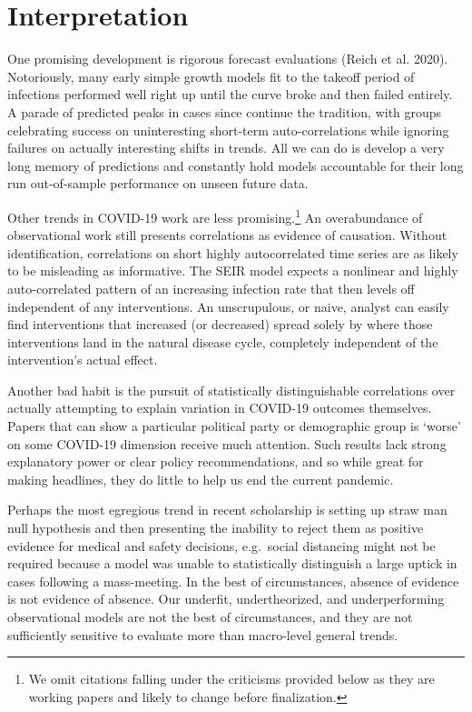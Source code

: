 \documentclass[
]{article}
\begin{document}
\hypertarget{interpretation}{%
\section{Interpretation}\label{interpretation}}

One promising development is rigorous forecast evaluations (Reich et al.
2020). Notoriously, many early simple growth models fit to the takeoff
period of infections performed well right up until the curve broke and
then failed entirely. A parade of predicted peaks in cases since
continue the tradition, with groups celebrating success on uninteresting
short-term auto-correlations while ignoring failures on actually
interesting shifts in trends. All we can do is develop a very long
memory of predictions and constantly hold models accountable for their
long run out-of-sample performance on unseen future data.

Other trends in COVID-19 work are less promising.\footnote{We omit
  citations falling under the criticisms provided below as they are
  working papers and likely to change before finalization.} An
overabundance of observational work still presents correlations as
evidence of causation. Without identification, correlations on short
highly autocorrelated time series are as likely to be misleading as
informative. The SEIR model expects a nonlinear and highly
auto-correlated pattern of an increasing infection rate that then levels
off independent of any interventions. An unscrupulous, or naive, analyst
can easily find interventions that increased (or decreased) spread
solely by where those interventions land in the natural disease cycle,
completely independent of the intervention's actual effect.

Another bad habit is the pursuit of statistically distinguishable
correlations over actually attempting to explain variation in COVID-19
outcomes themselves. Papers that can show a particular political party
or demographic group is `worse' on some COVID-19 dimension receive much
attention. Such results lack strong explanatory power or clear policy
recommendations, and so while great for making headlines, they do little
to help us end the current pandemic.

Perhaps the most egregious trend in recent scholarship is setting up
straw man null hypothesis and then presenting the inability to reject
them as positive evidence for medical and safety decisions, e.g.~social
distancing might not be required because a model was unable to
statistically distinguish a large uptick in cases following a
mass-meeting. In the best of circumstances, absence of evidence is not
evidence of absence. Our underfit, undertheorized, and underperforming
observational models are not the best of circumstances, and they are not
sufficiently sensitive to evaluate more than macro-level general trends.
\end{document}
